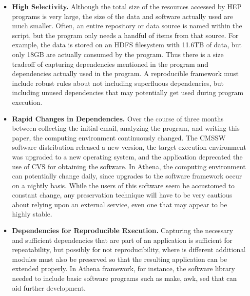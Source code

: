 \begin{itemize}
\item {\bf High Selectivity.}  
Although the total size of the resources accessed by HEP
programs is very large, the size of the data and software actually used are much smaller.
Often, an entire repository or data source is named within the script, but the program
only needs a handful of items from that source.  For example, the data is stored on an
HDFS filesystem with 11.6TB of data, but only 18GB are actually consumed by the program. 
Thus there is a size tradeoff of capturing dependencies mentioned in the program and dependencies actually used in the program.
A reproducible framework must include robust rules about not including superfluous dependencies, but including unused dependencies that may potentially get used during program execution.  

\item {\bf Rapid Changes in Dependencies.}  Over the course of three months
between collecting the initial email, analyzing the program, and writing this
paper, the computing environment continuously changed.  The CMSSW software
distribution released a new version, the target execution environment was upgraded
to a new operating system, and the application deprecated the use of CVS for obtaining
the software. In Athena, the computing environment can potentially change daily, since upgrades to the software framework occur on a nightly basis.  
While the users of this software seem be accustomed to constant change,
any preservation technique will have to be very cautious about relying upon an
external service, even one that may appear to be highly stable.

\item {\bf Dependencies for Reproducible Execution.} Capturing the necessary and sufficient dependencies that are part of an application is sufficient for repeatability, but possibly for not reproducibility, where is different additional modules
must also be preserved so that the resulting application can be extended properly. In Athena framework, for instance, the software library needed to include basic software programs such as make, awk, sed that can aid further development. 
\end{itemize}

